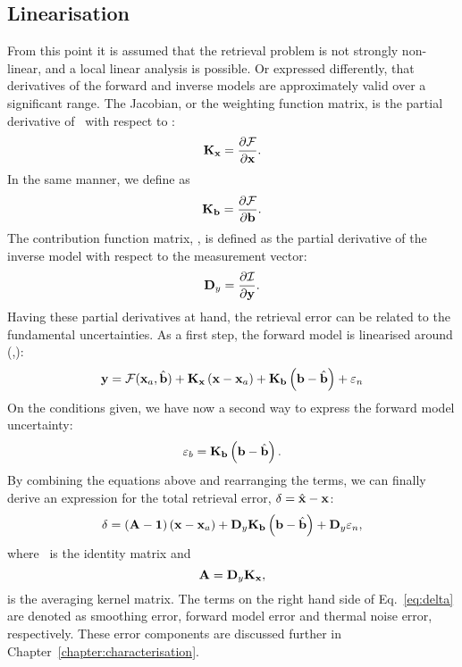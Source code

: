 \subsection{Linearisation}
%
From this point it is assumed that the retrieval problem is not strongly
non-linear, and a local linear analysis is possible. Or expressed differently,
that derivatives of the forward and inverse models are approximately valid over
a significant range. The Jacobian, or the weighting function matrix, is the
partial derivative of \FrwMdl\ with respect to \SttVct:
\begin{equation}
  \label{eq:kx}
  \mathbf{K}_{\mathbf{x}} = \frac{\partial\mathcal{F}}{\partial\mathbf{x}}.
\end{equation}
In the same manner, we define \aWfnMtr{\FrwMdlVct} as
\begin{equation}
  \label{eq:kb}
  \mathbf{K}_{\mathbf{b}} = \frac{\partial\mathcal{F}}{\partial\mathbf{b}}.
\end{equation}
The contribution function matrix, \CtrFncMtr, is defined as the partial
derivative of the inverse model with respect to the measurement vector:
\begin{equation}
  \label{eq:g}
  \mathbf{D}_{y} = \frac{\partial\mathcal{I}}{\partial\mathbf{y}}.
\end{equation}
Having these partial derivatives at hand, the retrieval error can be related
to the fundamental uncertainties. As a first step, the forward model is
linearised around (,\FrwMdlVctHat):
\begin{equation}
  \label{eq:fmodel3}
  \mathbf{y} = \mathcal{F}(\mathbf{x}_{a},\hat{\mathbf{b}}) + 
  \mathbf{K}_{\mathbf{x}}\left(\mathbf{x}-\mathbf{x}_{a}\right) +
  \mathbf{K}_{\mathbf{b}}\left(\mathbf{b}-\hat{\mathbf{b}}\right) +
  \varepsilon_n
\end{equation}
On the conditions given, we have now a second way to express the forward
model uncertainty:
\begin{equation}
  \varepsilon_b = \mathbf{K}_{\mathbf{b}}\left(\mathbf{b}-\hat{\mathbf{b}}\right).
\end{equation}
By combining the equations above and rearranging the terms, we can finally
derive an expression for the total retrieval error, $\delta = \hat{\mathbf{x}} - \mathbf{x}$:
\begin{equation}
  \label{eq:delta}
  \delta =  \left(\mathbf{A}-\mathbf{1}\right)
    \left(\mathbf{x}-\mathbf{x}_{a}\right) + 
    \mathbf{D}_{y}\mathbf{K}_{\mathbf{b}}\left(\mathbf{b}-\hat{\mathbf{b}}\right) +
    \mathbf{D}_{y}\varepsilon_n,
\end{equation}
where \IdnMtr\ is the identity matrix and
\begin{equation}
  \label{eq:A}
  \mathbf{A} = \mathbf{D}_{y}\mathbf{K}_{\mathbf{x}},
\end{equation}
is the averaging kernel matrix. The terms on the right hand side of
Eq.~\ref{eq:delta} are denoted as smoothing error, forward model error and
thermal noise error, respectively. These error components are discussed further
in Chapter~\ref{chapter:characterisation}.


